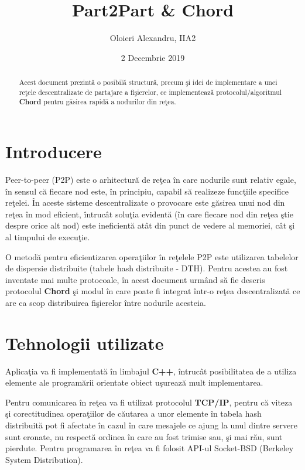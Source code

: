 \documentclass[runningheads]{llncs}
\title{Part2Part \& Chord}
\author{Oloieri Alexandru, IIA2}
\institute{Facultatea de Informatică Iași}
\date{2 Decembrie 2019}
\begin{document}
\maketitle

\begin{abstract}

\centering
Acest document prezintă o posibilă structură, precum şi idei de implementare a unei reţele descentralizate de partajare a fişierelor, ce implementează protocolul/algoritmul \textbf{Chord} pentru găsirea rapidă a nodurilor din reţea.

\end{abstract}

\section{Introducere}

Peer-to-peer (P2P) este o arhitectură de reţea în care nodurile sunt relativ egale, în sensul că fiecare nod este, în principiu, capabil să realizeze funcţiile specifice reţelei. În aceste sisteme descentralizate o provocare este găsirea unui nod din reţea în mod eficient, întrucât soluţia evidentă (în care fiecare nod din reţea ştie despre orice alt nod) este ineficientă atât din punct de vedere al memoriei, cât şi al timpului de execuţie. 

O metodă pentru eficientizarea operaţiilor în reţelele P2P este utilizarea tabelelor de dispersie distribuite (tabele hash distribuite - DTH). Pentru acestea au fost inventate mai multe protocoale, în acest document urmând să fie descris protocolul \textbf{Chord} şi modul în care poate fi integrat într-o reţea descentralizată ce are ca scop distribuirea fişierelor între nodurile acesteia.

\section{Tehnologii utilizate}

Aplicaţia va fi implementată în limbajul \textbf{C++}, întrucât posibilitatea de a utiliza elemente ale programării orientate obiect uşurează mult implementarea.

Pentru comunicarea în reţea va fi utilizat protocolul \textbf{TCP/IP}, pentru că viteza şi corectitudinea operaţiilor de căutarea a unor elemente în tabela hash distribuită pot fi afectate în cazul în care mesajele ce ajung la unul dintre servere sunt eronate, nu respectă ordinea în care au fost trimise sau, şi mai rău, sunt pierdute. Pentru programarea în reţea va fi folosit API-ul Socket-BSD (Berkeley System Distribution).
\end{document}
